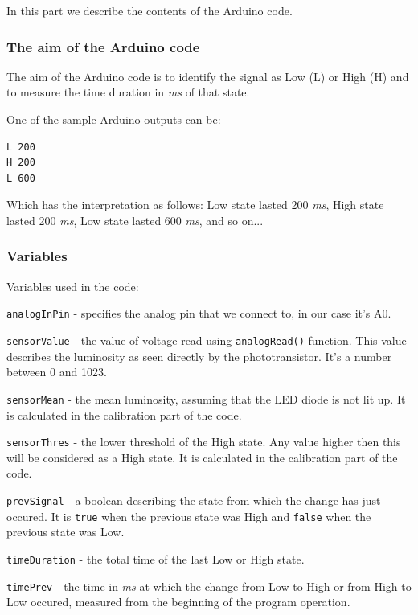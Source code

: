 \documentclass[12pt]{report}
\begin{document}
In this part we describe the contents of the Arduino code.

\subsubsection{The aim of the Arduino code}

The aim of the Arduino code is to identify the signal as Low (L) or High (H) and to measure the time duration in \textit{ms} of that state.

One of the sample Arduino outputs can be:

\begin{snugshade}
\begin{verbatim}
L 200
H 200
L 600
\end{verbatim}
\end{snugshade}

Which has the interpretation as follows: Low state lasted 200 \textit{ms}, High state lasted 200 \textit{ms}, Low state lasted 600 \textit{ms}, and so on...




\subsubsection{Variables}

Variables used in the code:

\verb|analogInPin| - specifies the analog pin that we connect to, in our case it's A0.

\verb|sensorValue| - the value of voltage read using \verb|analogRead()| function. This value describes the luminosity as seen directly by the phototransistor. It's a number between 0 and 1023.

\verb|sensorMean| - the mean luminosity, assuming that the LED diode is not lit up. It is calculated in the calibration part of the code.

\verb|sensorThres| - the lower threshold of the High state. Any value higher then this will be considered as a High state. It is calculated in the calibration part of the code.

\verb|prevSignal| - a boolean describing the state from which the change has just occured. It is \verb|true| when the previous state was High and \verb|false| when the previous state was Low.

\verb|timeDuration| - the total time of the last Low or High state.

\verb|timePrev| - the time in \textit{ms} at which the change from Low to High or from High to Low occured, measured from the beginning of the program operation.
\end{document}
